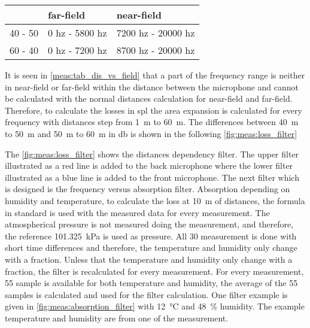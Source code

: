 \begin{table}[H]
\begin{tabular}{l|ll}
        & far-field      & near-field         \\ \hline
40 - 50 & 0 hz - 5800 hz & 7200 hz - 20000 hz \\
60 - 40 & 0 hz - 7200 hz & 8700 hz - 20000 hz
\end{tabular}
\label{meas:tab_dis_vs_field}
\end{table}

It is seen in \autoref{meas:tab_dis_vs_field} that a part of the frequency range is neither in near-field or far-field within the distance between the microphone and cannot be calculated with the normal distances calculation for near-field and far-field. Therefore, to calculate the losses in \gls{spl} the area expansion is calculated for every frequency with distances step from \SI{1}{\meter} to \SI{60}{\meter}. The differences between \SI{40}{\meter} to \SI{50}{\meter} and \SI{50}{\meter} to \SI{60}{\meter} in \si{\decibel} is shown in the following \autoref{fig:meas:loss_filter}


The \autoref{fig:meas:loss_filter} shows the distances dependency filter. The upper filter illustrated as a red line is added to the back microphone where the lower filter illustrated as a blue line is added to the front microphone. The next filter which is designed is the frequency versus absorption filter. 
Absorption depending on humidity and temperature, to calculate the loss at \SI{10}{\meter} of distances, the formula in standard \citep{iso_9613-1} is used with the measured data for every measurement. The atmospherical pressure is not measured doing the measurement, and therefore, the reference \SI{101.325}{\kilo\pascal} is used as pressure. All 30 measurement is done with short time differences and therefore, the temperature and humidity only change with a fraction. Unless that the temperature and humidity only change with a fraction, the filter is recalculated for every measurement. For every measurement, 55 sample is available for both temperature and humidity, the average of the 55 samples is calculated and used for the filter calculation. One filter example is given in \autoref{fig:meas:absorption_filter} with \SI{12}{\celsius} and \SI{48}{\percent} humidity. The example temperature and humidity are from one of the measurement.

